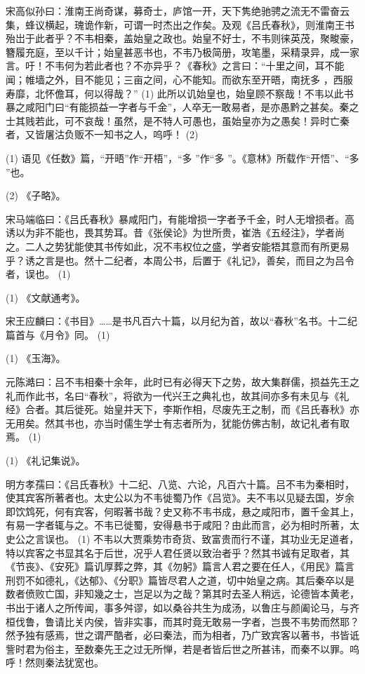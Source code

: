 \documentclass[12pt,UTF8]{ctexbook}
\begin{document}
宋高似孙曰：淮南王尚奇谋，募奇士，庐馆一开，天下隽绝驰骋之流无不雷奋云集，蜂议横起，瑰诡作新，可谓一时杰出之作矣。及观《吕氏春秋》，则淮南王书殆岀于此者乎？不韦相秦，盖始皇之政也。始皇不好士，不韦则徕英茂，聚畯豪，簪履充庭，至以千计；始皇甚恶书也，不韦乃极简册，攻笔墨，采精录异，成一家言。吁！不韦何为若此者也？不亦异乎？《春秋》之言曰：“十里之间，耳不能闻；帷墙之外，目不能见；三亩之间，心不能知。而欲东至开晤，南抚多 ，西服寿靡，北怀儋耳，何以得哉？” (1) 此所以讥始皇也，始皇顾不察哉！不韦以此书暴之咸阳门曰“有能损益一字者与千金”，人卒无一敢易者，是亦愚黔之甚矣。秦之士其贱若此，可不哀哉！虽然，是不特人可愚也，虽始皇亦为之愚矣！异时亡秦者，又皆屠沽负贩不一知书之人，呜呼！ (2)

(1) 语见《任数》篇，“开晤”作“开梧”，“多 ”作“多 ”。《意林》所载作“开悟”、“多 ”也。

(2) 《子略》。

宋马端临曰：《吕氏春秋》暴咸阳门，有能增损一字者予千金，时人无增损者。高诱以为非不能也，畏其势耳。昔《张侯论》为世所贵，崔浩《五经注》，学者尚之。二人之势犹能使其书传如此，况不韦权位之盛，学者安能牾其意而有所更易乎？诱之言是也。然十二纪者，本周公书，后置于《礼记》，善矣，而目之为吕令者，误也。 (1)

(1) 《文献通考》。

宋王应麟曰：《书目》……是书凡百六十篇，以月纪为首，故以“春秋”名书。十二纪篇首与《月令》同。 (1)

(1) 《玉海》。

元陈澔曰：吕不韦相秦十余年，此时已有必得天下之势，故大集群儒，损益先王之礼而作此书，名曰“春秋”，将欲为一代兴王之典礼也，故其间亦多有未见与《礼经》合者。其后徙死。始皇并天下，李斯作相，尽废先王之制，而《吕氏春秋》亦无用矣。然其书也，亦当时儒生学士有志者所为，犹能仿佛古制，故记礼者有取焉。 (1)

(1) 《礼记集说》。

明方孝孺曰：《吕氏春秋》十二纪、八览、六论，凡百六十篇。吕不韦为秦相时，使其宾客所著者也。太史公以为不韦徙蜀乃作《吕览》。夫不韦以见疑去国，岁余即饮鸩死，何有宾客，何暇著书哉？史又称不韦书成，悬之咸阳市，置千金其上，有易一字者辄与之。不韦已徙蜀，安得悬书于咸阳？由此而言，必为相时所著，太史公之言误也。 (1) 不韦以大贾乘势市奇货、致富贵而行不谨，其功业无足道者，特以宾客之书显其名于后世，况乎人君任贤以致治者乎？然其书诚有足取者，其《节丧》、《安死》篇讥厚葬之弊，其《勿躬》篇言人君之要在任人，《用民》篇言刑罚不如德礼，《达郁》、《分职》篇皆尽君人之道，切中始皇之病。其后秦卒以是数者偾败亡国，非知幾之士，岂足以为之哉？第其时去圣人稍远，论德皆本黄老，书出于诸人之所传闻，事多舛谬，如以桑谷共生为成汤，以鲁庄与颜阖论马，与齐桓伐鲁，鲁请比关内侯，皆非实事，而其时竟无敢易一字者，岂畏不韦势而然耶？然予独有感焉，世之谓严酷者，必曰秦法，而为相者，乃广致宾客以著书，书皆诋訾时君为俗主，至数秦先王之过无所惮，若是者皆后世之所甚讳，而秦不以罪。呜呼！然则秦法犹宽也。
\end{document}
